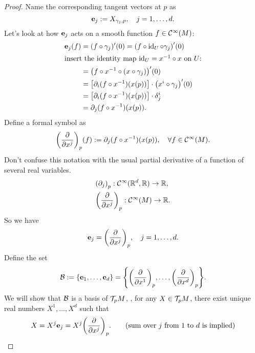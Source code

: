 \begin{proof}
    Name the corresponding tangent vectors at \(p\) as
    \begin{equation}
        \vb{e}_j := X_{\gamma_j, p}, \quad j = 1, \ldots, d.
    \end{equation}
    Let's look at how \(\vb{e}_j\) acts on a smooth function \(f \in \mathcal C^\infty(M)\):
    \begin{align*}
        \vb{e}_j(f) & = (f \circ \gamma_j)'(0) = \qty(f \circ \operatorname{id}_U \circ \gamma_j)'(0)            \\
        \shortintertext{insert the identity map \(\operatorname{id}_U = x^{-1} \circ x\) on \(U\):}
                    & = \qty(f \circ x^{-1} \circ (x \circ \gamma_j))'(0)                          \\
                    & = \qty[\partial_i (f \circ x^{-1})(x(p))] \cdot \qty(x^i \circ \gamma_j)'(0) \\
                    & = \qty[\partial_i (f \circ x^{-1})(x(p))] \cdot \delta_j^i                   \\
                    & = \partial_j (f \circ x^{-1})(x(p)).
    \end{align*}
    Define a formal symbol as
    \begin{equation}
        \qty(\pdv{x^j})_p (f) := \partial_j (f \circ x^{-1})(x(p)), \quad \forall f \in \mathcal C^\infty(M).
    \end{equation}
    Don't confuse this notation with the usual partial derivative of a function of several real variables.
    \begin{align*}
         & \qty(\partial_j)_p: \mathcal C^\infty(\mathbb R^d, \mathbb R) \to \mathbb R, \\
         & \qty(\pdv{x^j})_p: \mathcal C^\infty(M) \to \mathbb R.
    \end{align*}
    So we have
    \begin{equation}
        \vb{e}_j = \qty(\pdv{x^j})_p, \quad j = 1, \ldots, d.
    \end{equation}
    Define the set
    \begin{equation}
        \mathcal B := \qty{\vb{e}_1, \ldots, \vb{e}_d} = \qty{\qty(\pdv{x^1})_p, \ldots, \qty(\pdv{x^d})_p}.
    \end{equation}
    We will show that \(\mathcal B\) is a basis of \(\mathcal T_p M\), \ie, for any \(X \in \mathcal T_p M\), there exist unique real numbers \(X^1, \ldots, X^d\) such that
    \begin{equation}
        X = X^j \vb{e}_j = X^j \qty(\pdv{x^j})_p. \qquad \text{(sum over \(j\) from \(1\) to \(d\) is implied)}
    \end{equation}

\end{proof}
